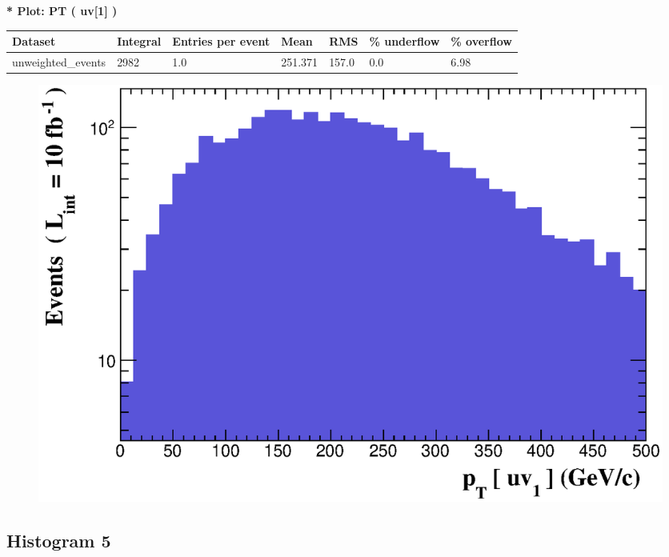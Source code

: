 \documentclass[a4paper, 10pt]{article}
\begin{document}
\textbf{* Plot: PT ( uv[1] ) }\\
   \begin{table}[H]
  \begin{center}
    \begin{tabular}{|m{23.0mm}|m{23.0mm}|m{18.0mm}|m{19.0mm}|m{19.0mm}|m{19.0mm}|m{19.0mm}|}
      \hline
      {\cellcolor{yellow}         Dataset}& {\cellcolor{yellow}         Integral}& {\cellcolor{yellow}         Entries per event}& {\cellcolor{yellow}         Mean}& {\cellcolor{yellow}         RMS}& {\cellcolor{yellow}         \% underflow}& {\cellcolor{yellow}         \% overflow}\\
      \hline
      {\cellcolor{white}         unweighted\_events}& {\cellcolor{white}         2982}& {\cellcolor{white}         1.0}& {\cellcolor{white}         251.371}& {\cellcolor{white}         157.0}& {\cellcolor{orange}         0.0}& {\cellcolor{orange}         6.98}\\
\hline
    \end{tabular}
  \end{center}
\end{table}

\begin{figure}[H]
  \begin{center}
    \includegraphics[scale=0.45]{selection_3.eps}\\
\caption{   }
  \end{center}
\end{figure}
      \newpage
\subsection{ Histogram 5}
\end{document}
